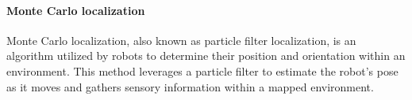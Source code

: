 \paragraph*{Monte Carlo localization}
Monte Carlo localization, also known as particle filter localization, is an algorithm utilized by robots to determine their position and orientation within an environment. 
This method leverages a particle filter to estimate the robot's pose as it moves and gathers sensory information within a mapped environment.